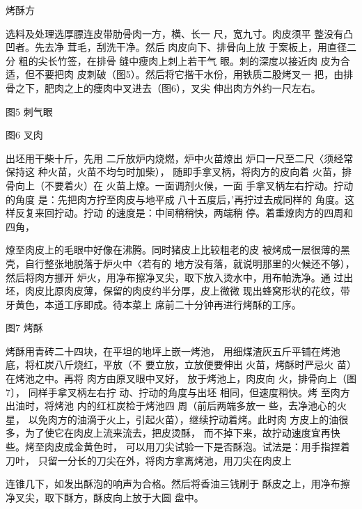 \begin{recipe}{烤酥方}

\ingredients


\cooking

\step 选料及处理选厚膘连皮带肋骨肉一方，横、长一 尺，宽九寸。肉皮须平
整没有凸凹者。先去净 茸毛，刮洗干净。然后 肉皮向下、排骨向上放
于案板上，用直径二分 粗的尖长竹签，在排骨 缝中瘦肉上刺上若干气
眼。刺的深度以接近肉 皮为合适，但不要把肉
皮刺破（图5）。然后将它揩干水份，用铁质二股烤叉一
把，由排骨之下，肥肉之上的痩肉中叉进去（图6），叉尖 伸出肉方外约一尺左右。

图5 刺气眼

图6 叉肉

\step 出坯用干柴十斤，先用 二斤放炉内烧燃，炉中火苗燎出
炉口一尺至二尺〈须经常保持这 种火苗，火苗不均匀时加柴），
随即手拿叉柄，将肉方的皮向着 火苗，排骨向上（不要着火）在
火苗上燎。一面调剂火候，一面 手拿叉柄左右拧动。拧动的角度
是：先把肉方拧至肉皮与地平成 八十五度后，'再拧过去成同样的
角度。这样反复来回拧动。拧动 的速度是：中间稍稍快，两端稍
停。着重燎肉方的四周和四角，

燎至肉皮上的毛眼中好像在沸腾。同时猪皮上比较粗老的皮
被烤成一层很薄的黑壳，自行整张地脱落于炉火中〈若有的
地方没有落，就说明那里的火候还不够），然后将肉方挪开
炉火，用净布擦净叉尖，取下放入烫水中，用布帕洗净。通
过出坯，肉皮比原肉皮薄，保留的肉皮约半分厚，皮上微微
现出蜂窝形状的花纹，带牙黄色，本道工序即成。待本菜上
席前二十分钟再进行烤酥的工序。

图7 烤酥

\step 烤酥用青砖二十四块，在平坦的地坪上嵌一烤池，
用细煤渣灰五斤平铺在烤池底，将杠炭八斤烧红，平放（不
要立放，立放便要伸出 火苗，烤酥时严忌火 苗）在烤池之中。再将
肉方由原叉眼中叉好， 放于烤池上，肉皮向 火，排骨向上（图7〕，
同样手拿叉柄左右拧 动、拧动的角度与出坯 相同，但速度稍快。烤
至肉方出油时，将烤池 内的红杠炭检于烤池四 周（前后两端多放一
些，去净池心的火星， 以免肉方的油滴于火上，引起火苗），继续拧动着烤。此时肉
方皮上的油很多，为了使它在肉皮上流来流去，把皮烫酥，
而不掉下来，故拧动速度宜再快些。烤至肉皮成金黄色时，
可以用刀尖试验一下是否酥泡。试法是：用手指捏着刀叶，
只留一分长的刀尖在外，将肉方拿离烤池，用刀尖在肉皮上

连锥几下，如发出酥泡的响声为合格。然后将香油三钱刷于
酥皮之上，用净布擦净叉尖，取下酥方，酥皮向上放于大圆 盘中。


\end{recipe}
